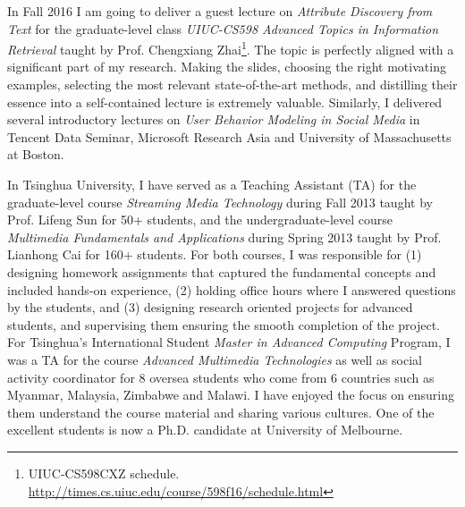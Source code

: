 \documentclass[10.5pt]{article}
\begin{document}
In Fall 2016 I am going to deliver a guest lecture on \textit{Attribute Discovery from Text} for the graduate-level class \textit{UIUC-CS598 Advanced Topics in Information Retrieval} taught by Prof. Chengxiang Zhai\footnote{UIUC-CS598CXZ schedule. \url{http://times.cs.uiuc.edu/course/598f16/schedule.html}}. The topic is perfectly aligned with a significant part of my research. Making the slides, choosing the right motivating examples, selecting the most relevant state-of-the-art methods, and distilling their essence into a self-contained lecture is extremely valuable. Similarly, I delivered several introductory lectures on \textit{User Behavior Modeling in Social Media} in Tencent Data Seminar, Microsoft Research Asia and University of Massachusetts at Boston.

\vskip 0.06in
\vskip 0.02in

In Tsinghua University, I have served as a Teaching Assistant (TA) for the graduate-level course \textit{Streaming Media Technology} during Fall 2013 taught by Prof. Lifeng Sun for 50+ students, and the undergraduate-level course \textit{Multimedia Fundamentals and Applications} during Spring 2013 taught by Prof. Lianhong Cai for 160+ students. For both courses, I was responsible for (1) designing homework assignments that captured the fundamental concepts and included hands-on experience, (2) holding office hours where I answered questions by the students, and (3) designing research oriented projects for advanced students, and supervising them ensuring the smooth completion of the project. For Tsinghua's International Student \textit{Master in Advanced Computing} Program, I was a TA for the course \textit{Advanced Multimedia Technologies} as well as social activity coordinator for 8 oversea students who come from 6 countries such as Myanmar, Malaysia, Zimbabwe and Malawi. I have enjoyed the focus on ensuring them understand the course material and sharing various cultures. One of the excellent students is now a Ph.D. candidate at University of Melbourne.

\vskip 0.06in
\vskip 0.02in
\end{document}
